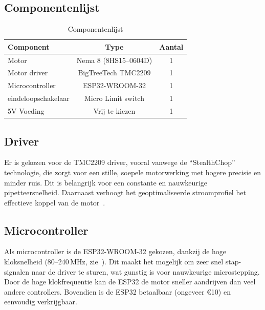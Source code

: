 \subsection{Componentenlijst}
\begin{table}[H]
    \centering
    \caption{Componentenlijst}\label{tab:componentenlijst}
    \begin{minipage}{\linewidth}
        \centering
        \begin{tabular}{|l|c|c|}
            \hline
            \textbf{Component} & \textbf{Type} & \textbf{Aantal} \\
            \hline
            Motor & Nema 8 (8HS15--0604D) & 1 \\
            Motor driver & BigTreeTech TMC2209 & 1 \\
            Microcontroller & ESP32-WROOM-32 & 1 \\
            eindeloopschakelaar & Micro Limit switch & 1 \\
            5V Voeding & Vrij te kiezen\footnotemark & 1 \\
            \hline
        \end{tabular}
    \end{minipage}
\end{table}

\subsection{Driver}
Er is gekozen voor de TMC2209 driver, vooral vanwege de ``StealthChop'' technologie, die zorgt voor een stille, soepele motorwerking met hogere precisie en minder ruis. Dit is belangrijk voor een constante en nauwkeurige pipetteersnelheid. Daarnaast verhoogt het geoptimaliseerde stroomprofiel het effectieve koppel van de motor\ \cite{RN45}.

\subsection{Microcontroller}
Als microcontroller is de ESP32-WROOM-32 gekozen, dankzij de hoge kloksnelheid (80–240\,MHz, zie\ \cite{RN47}). Dit maakt het mogelijk om zeer snel stap-signalen naar de driver te sturen, wat gunstig is voor nauwkeurige microstepping. Door de hoge klokfrequentie kan de ESP32 de motor sneller aandrijven dan veel andere controllers. Bovendien is de ESP32 betaalbaar (ongeveer €10) en eenvoudig verkrijgbaar.
